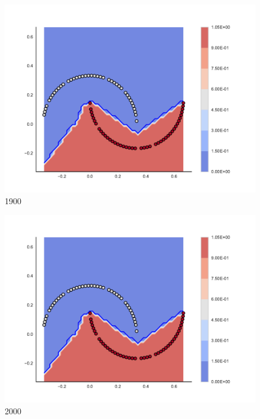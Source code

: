 \begin{subfigure}[b]{0.09\textwidth}
    \includegraphics[clip, trim=2.35cm 1.75cm 4.5cm 0cm,width=\textwidth]{img/convergence/1900.pdf}
    \caption{1900}
    \label{fig:convergence_1900}
\end{subfigure}
%
\begin{subfigure}[b]{0.09\textwidth}
    \includegraphics[clip, trim=2.35cm 1.75cm 4.5cm 0cm,width=\textwidth]{img/convergence/2000.pdf}
    \caption{2000}
    \label{fig:convergence_2000}
\end{subfigure}
%
